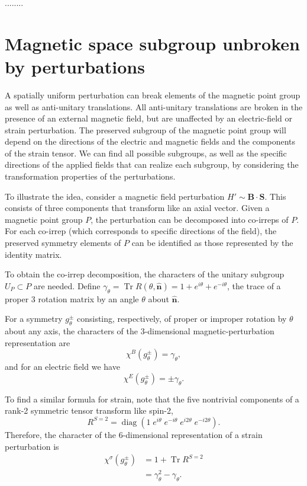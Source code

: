 \documentclass[12pt, a4paper]{article}
\DeclareMathOperator{\Tr}{Tr}
\DeclareMathOperator{\diag}{diag}
\begin{document}
........




\section{Magnetic space subgroup unbroken by perturbations}
A spatially uniform perturbation can break elements of the magnetic point group as well as anti-unitary translations. All anti-unitary translations are broken in the presence of an external magnetic field, but are unaffected by an electric-field or strain perturbation. The preserved subgroup of the magnetic point group will depend on the directions of the electric and magnetic fields and the components of the strain tensor. We can find all possible subgroups, as well as the specific directions of the applied fields that can realize each subgroup, by considering the transformation properties of the perturbations.

To illustrate the idea, consider a magnetic field perturbation $H'\sim\bm{B}\cdot\bm{S}$. This consists of three components that transform like an axial vector. Given a magnetic point group $P$, the perturbation can be decomposed into co-irreps of $P$. For each co-irrep (which corresponds to specific directions of the field), the preserved symmetry elements of $P$ can be identified as those represented by the identity matrix.

To obtain the co-irrep decomposition, the characters of the unitary subgroup $U_{P}\subset P$ are needed. Define $\gamma_{\theta}=\Tr R(\theta, \hat{\bm{n}})=1+e^{i\theta}+e^{-i\theta}$, the trace of a proper 3 rotation matrix by an angle $\theta$ about $\hat{\bm{n}}$.

For a symmetry $g_{\theta}^{\pm}$ consisting, respectively, of proper or improper rotation by $\theta$ about any axis, the characters of the 3-dimensional magnetic-perturbation representation are
\begin{equation}
  \chi^B(g^{\pm}_{\theta})=\gamma_{\theta},
\end{equation}
and for an electric field we have
\begin{equation}
  \chi^E(g^{\pm}_{\theta})=\pm\gamma_{\theta}.
\end{equation}

To find a similar formula for strain, note that the five nontrivial components of a rank-2 symmetric tensor transform like spin-2,
\begin{equation}
  R^{S=2}=\diag(1\;e^{i\theta}\;e^{-i\theta}\;e^{i2\theta}\;e^{-i2\theta}).
\end{equation}
Therefore, the character of the 6-dimensional representation of a strain perturbation is 
\begin{align}
  \chi^{\sigma}(g^{\pm}_{\theta}) &= 1+\Tr R^{S=2} \\
   &= \gamma_{\theta}^2-\gamma_{\theta}.
\end{align}
\end{document}
